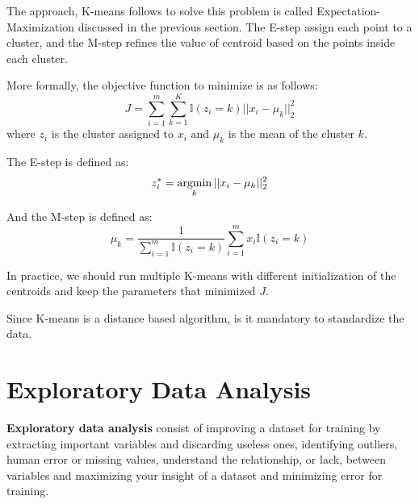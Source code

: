 \documentclass[12pt]{report}
\newcommand{\argmin}{\operatornamewithlimits{argmin}}
\begin{document}
            The approach, K-means follows to solve this problem is called Expectation-Maximization discussed in the previous section. The E-step assign each point to a cluster, and the M-step refines the value of centroid based on the points inside each cluster.
            
            More formally, the objective function to minimize is as follows:
            \begin{equation}
                J = \sum_{i=1}^{m} \sum_{k=1}^{K} \mathbb{I}(z_i = k)||x_i - \mu_k||_2^2
            \end{equation}
            where $z_i$ is the cluster assigned to $x_i$ and $\mu_k$ is the mean of the cluster $k$.
            
            The E-step is defined as:
            \begin{equation}
                z_i^{*} = \argmin_{k} ||x_i - \mu_k||_2^2
            \end{equation}
            
            And the M-step is defined as:
            \begin{equation}
                \mu_k = \frac{1}{\sum_{i=1}^m \mathbb{I}(z_i = k)} \sum_{i=1}^m  x_i\mathbb{I}(z_i = k)
            \end{equation}
            
            In practice, we should run multiple K-means with different initialization of the centroids and keep the parameters that minimized $J$.

            Since K-means is a distance based algorithm, is it mandatory to standardize the data. 
            
            
            
\chapter{Exploratory Data Analysis}
    \textbf{Exploratory data analysis} consist of improving a dataset for training by extracting important variables and discarding useless ones, identifying outliers, human error or missing values, understand the relationship, or lack, between variables and maximizing your insight of a dataset and minimizing error for training.
    
    
\end{document}
